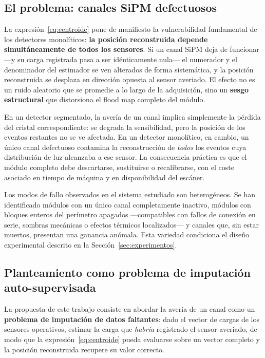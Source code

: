 \subsection{El problema: canales SiPM defectuosos}
\label{subsec:problema-canales}

La expresión~\eqref{eq:centroide} pone de manifiesto la vulnerabilidad fundamental de los
detectores monolíticos: \textbf{la posición reconstruida depende simultáneamente de todos los
sensores}. Si un canal SiPM deja de funcionar ---y su carga registrada pasa a ser idénticamente
nula--- el numerador y el denominador del estimador se ven alterados de forma sistemática, y la
posición reconstruida se desplaza en dirección opuesta al sensor averiado. El efecto no es un ruido
aleatorio que se promedie a lo largo de la adquisición, sino un \textbf{sesgo estructural} que
distorsiona el flood map completo del módulo.

En un detector segmentado, la avería de un canal implica simplemente la pérdida del cristal
correspondiente: se degrada la sensibilidad, pero la posición de los eventos restantes no se ve
afectada. En un detector monolítico, en cambio, un único canal defectuoso contamina la
reconstrucción de \emph{todos} los eventos cuya distribución de luz alcanzaba a ese sensor. La
consecuencia práctica es que el módulo completo debe descartarse, sustituirse o recalibrarse, con el
coste asociado en tiempo de máquina y en disponibilidad del escáner.

Los modos de fallo observados en el sistema estudiado son heterogéneos. Se han identificado módulos
con un único canal completamente inactivo, módulos con bloques enteros del perímetro apagados
---compatibles con fallos de conexión en serie, sombras mecánicas o efectos térmicos localizados---
y canales que, sin estar muertos, presentan una ganancia anómala. Esta variedad condiciona el diseño
experimental descrito en la Sección~\ref{sec:experimentos}.

\subsection{Planteamiento como problema de imputación auto-supervisada}
\label{subsec:planteamiento}

La propuesta de este trabajo consiste en abordar la avería de un canal como un
\textbf{problema de imputación de datos faltantes}: dado el vector de cargas de los sensores
operativos, estimar la carga que \emph{habría} registrado el sensor averiado, de modo que la
expresión~\eqref{eq:centroide} pueda evaluarse sobre un vector completo y la posición reconstruida
recupere su valor correcto.

